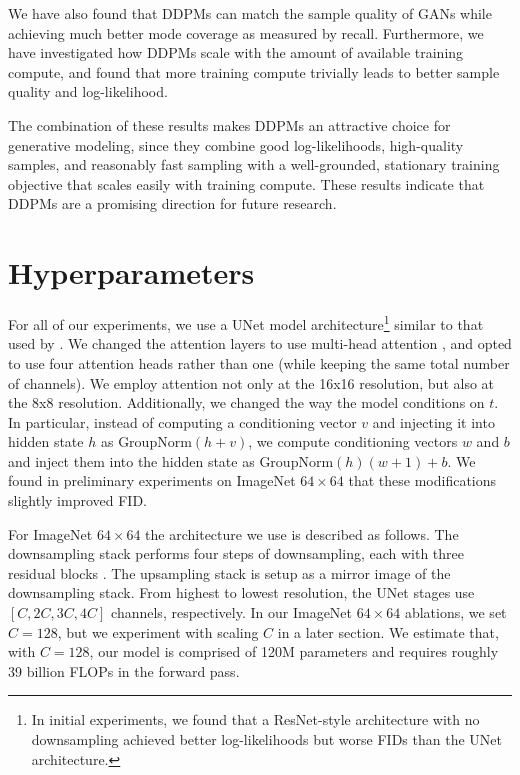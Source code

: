 \documentclass{article}
\begin{document}
We have also found that DDPMs can match the sample quality of GANs while achieving much better mode coverage as measured by recall. Furthermore, we have investigated how DDPMs scale with the amount of available training compute, and found that more training compute trivially leads to better sample quality and log-likelihood.

The combination of these results makes DDPMs an attractive choice for generative modeling, since they combine good log-likelihoods, high-quality samples, and reasonably fast sampling with a well-grounded, stationary training objective that scales easily with training compute. These results indicate that DDPMs are a promising direction for future research.




\clearpage

\appendix

\section{Hyperparameters}
\label{app:hyperparameters}

For all of our experiments, we use a UNet model architecture\footnote{In initial experiments, we found that a ResNet-style architecture with no downsampling achieved better log-likelihoods but worse FIDs than the UNet architecture.} similar to that used by \citet{ddpm}. We changed the attention layers to use multi-head attention \citep{transformers}, and opted to use four attention heads rather than one (while keeping the same total number of channels). We employ attention not only at the 16x16 resolution, but also at the 8x8 resolution. Additionally, we changed the way the model conditions on $t$. In particular, instead of computing a conditioning vector $v$ and injecting it into hidden state $h$ as $\text{GroupNorm}(h + v)$, we compute conditioning vectors $w$ and $b$ and inject them into the hidden state as $\text{GroupNorm}(h)(w + 1) + b$. We found in preliminary experiments on ImageNet $64 \times 64$ that these modifications slightly improved FID.

For ImageNet $64 \times 64$ the architecture we use is described as follows. The downsampling stack performs four steps of downsampling, each with three residual blocks \citep{resnet}. The upsampling stack is setup as a mirror image of the downsampling stack. From highest to lowest resolution, the UNet stages use $[C, 2C, 3C, 4C]$ channels, respectively. In our ImageNet $64 \times 64$ ablations, we set $C=128$, but we experiment with scaling $C$ in a later section. We estimate that, with $C=128$, our model is comprised of 120M parameters and requires roughly 39 billion FLOPs in the forward pass.
\end{document}
